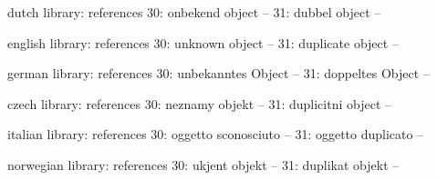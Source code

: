 

\unprotect

\startmessages  dutch  library: references
     30: onbekend object --
     31: dubbel object --
\stopmessages

\startmessages  english  library: references
     30: unknown object --
     31: duplicate object --
\stopmessages

\startmessages  german  library: references
     30: unbekanntes Object --
     31: doppeltes Object --
\stopmessages

\startmessages  czech  library: references
     30: neznamy objekt --
     31: duplicitni object --
\stopmessages

\startmessages  italian  library: references
     30: oggetto sconosciuto --
     31: oggetto duplicato --
\stopmessages

\startmessages  norwegian  library: references
     30: ukjent objekt --
     31: duplikat objekt --
\stopmessages


